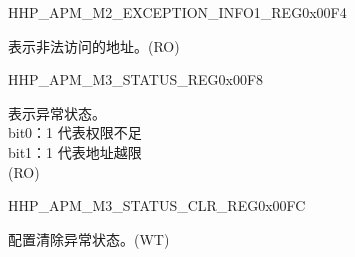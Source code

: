 \begin{register}{H}{HP\_APM\_M2\_EXCEPTION\_INFO1\_REG}{0x00F4}\label{regdesc:HPAPMM2EXCEPTIONINFO1REG}
%
\regnewline%
\begin{regdesc}\begin{reglist}
\label{fielddesc:HPAPMM2EXCEPTIONADDR}\item [HP\_APM\_M2\_EXCEPTION\_ADDR] 表示非法访问的地址。(RO)
\end{reglist}\end{regdesc}
\end{register}


\begin{register}{H}{HP\_APM\_M3\_STATUS\_REG}{0x00F8}\label{regdesc:HPAPMM3STATUSREG}
%
%
\regnewline%
\begin{regdesc}\begin{reglist}
\label{fielddesc:HPAPMM3EXCEPTIONSTATUS}\item [HP\_APM\_M3\_EXCEPTION\_STATUS] 表示异常状态。 \\
bit0：1 代表权限不足 \\
bit1：1 代表地址越限  \\ (RO)
\end{reglist}\end{regdesc}
\end{register}


\begin{register}{H}{HP\_APM\_M3\_STATUS\_CLR\_REG}{0x00FC}\label{regdesc:HPAPMM3STATUSCLRREG}
%
%
\regnewline%
\begin{regdesc}\begin{reglist}
\label{fielddesc:HPAPMM3EXCEPTIONSTATUSCLR}\item [HP\_APM\_M3\_EXCEPTION\_STATUS\_CLR] 配置清除异常状态。(WT)
\end{reglist}\end{regdesc}
\end{register}


